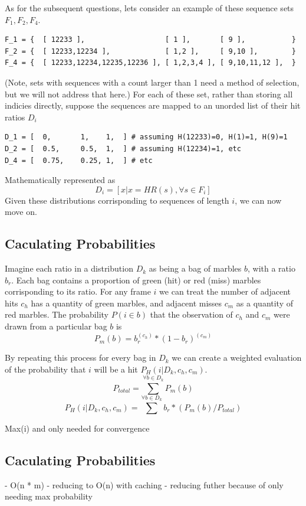 \documentclass{article}
\newcommand{\br}{ \hfill \break}
\begin{document}
\begin{adjustwidth}{2.5em}{0pt}
        As for the subsequent questions, lets consider an example of these sequence sets $F_1, F_2, F_4$.
        \begin{lstlisting}
F_1 = {  [ 12233 ],                   [ 1 ],       [ 9 ],           }
F_2 = {  [ 12233,12234 ],             [ 1,2 ],     [ 9,10 ],        }
F_4 = {  [ 12233,12234,12235,12236 ], [ 1,2,3,4 ], [ 9,10,11,12 ],  }
        \end{lstlisting}
        (Note, sets with sequences with a count larger than 1 need a method of selection, but we will not address that here.)\br
        For each of these set, rather than storing all indicies directly, suppose the sequences are mapped to an unorded list of their hit ratios $D_i$
        \begin{lstlisting}
D_1 = [  0,       1,    1,  ] # assuming H(12233)=0, H(1)=1, H(9)=1
D_2 = [  0.5,     0.5,  1,  ] # assuming H(12234)=1, etc
D_4 = [  0.75,    0.25, 1,  ] # etc
        \end{lstlisting}
        Mathematically represented as
        $$ D_i = [ x | x = \mathit{HR}(s), \forall s \in F_i  ]  $$
        Given these distributions corrisponding to sequences of length $i$, we can now move on.
        
    \subsection{Caculating Probabilities}
        Imagine each ratio in a distribution $D_k$ as being a bag of marbles $b$, with a ratio $b_r$. Each bag contains a proportion of green (hit) or red (miss) marbles corrisponding to its ratio. For any frame $i$ we can treat the number of adjacent hits $c_h$ has a quantity of green marbles, and adjacent misses $c_m$ as a quantity of red marbles. The probability $P(i \in b)$ that the observation of $c_h$ and $c_m$ were drawn from a particular bag $b$ is
            $$ P_m(b) =  b_r^{(c_h)} * (1-b_r)^{(c_m)}  $$
        
        By repeating this process for every bag in $D_k$ we can create a weighted evaluation of the probability that $i$ will be a hit $P_H(i | D_k, c_h, c_m)$.
        $$ P_\mathit{total} = \displaystyle\sum^{\forall b \in D_k} P_m(b) $$
        $$ P_H(i | D_k, c_h, c_m) = \displaystyle\sum^{\forall b \in D_k} b_r * ( P_m(b) / P_\mathit{total} )  $$
    
        Max(i) and only needed for convergence
        
    \subsection{Caculating Probabilities}
        - O(n * m)
        - reducing to O(n) with caching
        - reducing futher because of only needing max probability
    
    
        

%
%
\end{adjustwidth} \br
\end{document}
